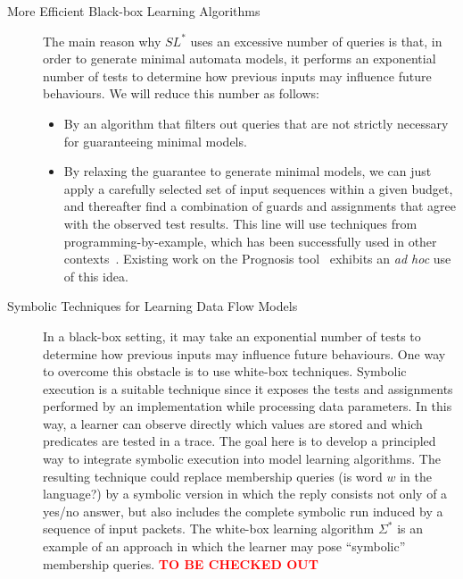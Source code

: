 \documentclass[11pt]{article}
\newcommand{\FIX}[1]{\textcolor{red}{\textbf{#1}}}
\newcommand{\system}[1]{\mbox{\textsf{#1}}}
\begin{document}
\begin{description}
\item[More Efficient Black-box Learning Algorithms]
  The main reason why $SL^*$ uses an excessive number of queries is that, in
  order to generate minimal automata models, it performs an exponential number
  of tests to determine how previous inputs may influence future behaviours.
  We will reduce this number as follows:
  \begin{itemize}
  \item
    By an algorithm that filters out queries that are not strictly necessary
    for guaranteeing minimal models.
  \item
    By relaxing the guarantee to generate minimal models, we can just apply a carefully selected set of input sequences within a given budget, and thereafter find a combination of guards and assignments that agree with the observed test results. This line will use techniques from programming-by-example, which has been successfully used in other contexts~\cite{GulwaniPS17}. Existing work on the Prognosis tool~\cite{Prognosis@SIGCOMM-21} exhibits an \emph{ad hoc} use of this idea.
  \end{itemize}
\item[Symbolic Techniques for Learning Data Flow Models]
  In a black-box setting, it may take an exponential number of tests to determine how previous inputs may influence future behaviours. One way to overcome this obstacle is to use white-box techniques. Symbolic execution is a suitable technique since it exposes the tests and assignments performed by an implementation while processing data parameters.
In this way, a learner can observe directly which values are stored and which predicates are tested in a trace.
The goal here is to develop a principled way to integrate symbolic execution into model learning algorithms.
The resulting technique could replace membership queries (is word $w$ in the language?) by a symbolic
version in which the reply consists not
only of a yes/no answer, but also includes the complete symbolic run induced by a
sequence of input packets.
The white-box learning algorithm $\Sigma^\ast$ \cite{BotincanB13} is an example of an approach in which the learner may pose ``symbolic'' membership queries.
\FIX{TO BE CHECKED OUT}
\end{description}
\end{document}
